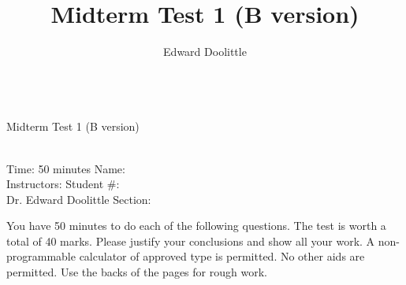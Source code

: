 \documentclass[12pt]{article}
\title{Midterm Test 1 (B version)}
\author{Edward Doolittle}
\begin{document}
\thispagestyle{plain}

\begin{center}
  \quad\\
  \LARGE{Midterm Test 1 (B version)}
\end{center}

\begin{flushleft}
\quad\\
Time: 50 minutes                \hfill       Name: \underline{\hspace{2in}}  \\
Instructors:                    \hfill Student \#: \underline{\hspace{2in}}  \\
\quad Dr. Edward Doolittle      \hfill    Section: \underline{\hspace{2in}}  \\
\end{flushleft}


\noindent
You have 50 minutes to do each of the following questions.
The test is worth a total of 40 marks.
Please justify your conclusions and
show all your work.
A non-programmable calculator of approved type is permitted.  No other aids
are permitted.
Use the backs of the pages for rough work.
\end{document}
